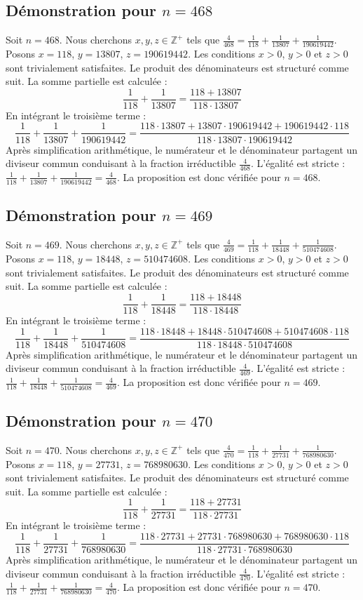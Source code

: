 \documentclass[11pt,a4paper]{article}
\begin{document}
\subsection{Démonstration pour $n = 468$}
Soit $n = 468$. Nous cherchons $x, y, z \in \mathbb{Z}^{+}$ tels que $\frac{4}{468} = \frac{1}{118} + \frac{1}{13807} + \frac{1}{190619442}$.
Posons $x = 118$, $y = 13807$, $z = 190619442$.
Les conditions $x > 0$, $y > 0$ et $z > 0$ sont trivialement satisfaites.
Le produit des dénominateurs est structuré comme suit. La somme partielle est calculée :
$$ \frac{1}{118} + \frac{1}{13807} = \frac{118+13807}{118 \cdot 13807} $$
En intégrant le troisième terme :
$$ \frac{1}{118} + \frac{1}{13807} + \frac{1}{190619442} = \frac{118 \cdot 13807 + 13807 \cdot 190619442 + 190619442 \cdot 118}{118 \cdot 13807 \cdot 190619442} $$
Après simplification arithmétique, le numérateur et le dénominateur partagent un diviseur commun conduisant à la fraction irréductible $\frac{4}{468}$.
L'égalité est stricte : $\frac{1}{118} + \frac{1}{13807} + \frac{1}{190619442} = \frac{4}{468}$.
La proposition est donc vérifiée pour $n = 468$.
\subsection{Démonstration pour $n = 469$}
Soit $n = 469$. Nous cherchons $x, y, z \in \mathbb{Z}^{+}$ tels que $\frac{4}{469} = \frac{1}{118} + \frac{1}{18448} + \frac{1}{510474608}$.
Posons $x = 118$, $y = 18448$, $z = 510474608$.
Les conditions $x > 0$, $y > 0$ et $z > 0$ sont trivialement satisfaites.
Le produit des dénominateurs est structuré comme suit. La somme partielle est calculée :
$$ \frac{1}{118} + \frac{1}{18448} = \frac{118+18448}{118 \cdot 18448} $$
En intégrant le troisième terme :
$$ \frac{1}{118} + \frac{1}{18448} + \frac{1}{510474608} = \frac{118 \cdot 18448 + 18448 \cdot 510474608 + 510474608 \cdot 118}{118 \cdot 18448 \cdot 510474608} $$
Après simplification arithmétique, le numérateur et le dénominateur partagent un diviseur commun conduisant à la fraction irréductible $\frac{4}{469}$.
L'égalité est stricte : $\frac{1}{118} + \frac{1}{18448} + \frac{1}{510474608} = \frac{4}{469}$.
La proposition est donc vérifiée pour $n = 469$.
\subsection{Démonstration pour $n = 470$}
Soit $n = 470$. Nous cherchons $x, y, z \in \mathbb{Z}^{+}$ tels que $\frac{4}{470} = \frac{1}{118} + \frac{1}{27731} + \frac{1}{768980630}$.
Posons $x = 118$, $y = 27731$, $z = 768980630$.
Les conditions $x > 0$, $y > 0$ et $z > 0$ sont trivialement satisfaites.
Le produit des dénominateurs est structuré comme suit. La somme partielle est calculée :
$$ \frac{1}{118} + \frac{1}{27731} = \frac{118+27731}{118 \cdot 27731} $$
En intégrant le troisième terme :
$$ \frac{1}{118} + \frac{1}{27731} + \frac{1}{768980630} = \frac{118 \cdot 27731 + 27731 \cdot 768980630 + 768980630 \cdot 118}{118 \cdot 27731 \cdot 768980630} $$
Après simplification arithmétique, le numérateur et le dénominateur partagent un diviseur commun conduisant à la fraction irréductible $\frac{4}{470}$.
L'égalité est stricte : $\frac{1}{118} + \frac{1}{27731} + \frac{1}{768980630} = \frac{4}{470}$.
La proposition est donc vérifiée pour $n = 470$.
\end{document}
